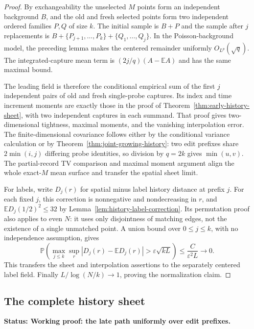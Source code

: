 \documentclass[11pt,letterpaper]{article}
\newcommand{\PP}{\mathbb P}\newcommand{\EE}{\mathbb E}
\newcommand{\status}[1]{\textbf{Status: #1.}}
\begin{document}
\begin{proof}
By exchangeability the unselected $M$ points form an
independent background $B$, and the old and fresh selected
points form two independent ordered families $P,Q$ of size $k$.
The initial sample is $B+P$ and the sample after $j$ replacements
is $B+\{P_{j+1},\ldots,P_k\}+\{Q_1,\ldots,Q_j\}$.
In the Poisson-background model, the preceding lemma makes
the centered remainder uniformly $O_{L^p}(\sqrt q)$.
The integrated-capture mean term is $(2j/q)(A-\EE A)$
and has the same maximal bound.

The leading field is therefore the conditional empirical
sum of the first $j$ independent pairs of old and fresh
single-probe captures. Its index and time increment
moments are exactly those in the proof of
Theorem~\ref{thm:early-history-sheet}, with two independent
captures in each summand.
That proof gives two-dimensional tightness, maximal moments,
and the vanishing interpolation error.
The finite-dimensional covariance follows either by the
conditional variance calculation or by
Theorem~\ref{thm:joint-growing-history}: two edit prefixes
share $2\min(i,j)$ differing probe identities, so division
by $q=2k$ gives $\min(u,v)$.
The partial-record TV comparison and maximal moment argument
align the whole exact-$M$ mean surface and transfer the
spatial sheet limit.

For labels, write $D_j(r)$ for spatial minus label history
distance at prefix $j$. For each fixed $j$, this correction
is nonnegative and nondecreasing in $r$, and
$\EE D_j(1/2)^2\le32$ by
Lemma~\ref{lem:history-label-correction}.
Its permutation proof also applies to even $N$: it uses
only disjointness of matching edges, not the existence of
a single unmatched point.
A union bound over $0\le j\le k$, with no independence
assumption, gives
\[
 \PP\!\left(\max_{j\le k}\sup_r
       |D_j(r)-\EE D_j(r)|>\varepsilon\sqrt{kL}\right)
                                      \le \frac{C}{\varepsilon^2L}
                                      \longrightarrow0.
\]
This transfers the sheet and interpolation assertions to
the separately centered label field.
Finally $L/\log(N/k)\to1$, proving the normalization claim.
\end{proof}

\subsection{The complete history sheet}
\label{sec:complete-history-sheet}

\status{Working proof: the late path uniformly over edit prefixes}
\end{document}
